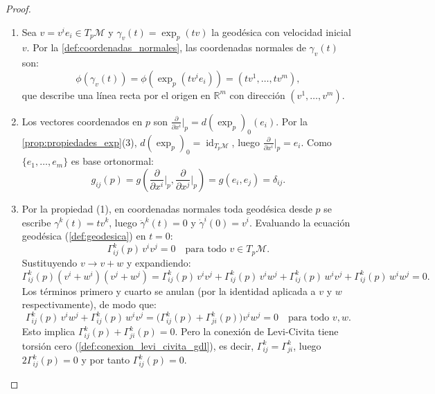 \begin{proof}
\leavevmode
\begin{enumerate}
	\item Sea $v = v^i e_i \in T_p\mathcal{M}$ y $\gamma_v(t) = \exp_p(tv)$ la geodésica con velocidad inicial $v$. Por la \autoref{def:coordenadas_normales}, las coordenadas normales de $\gamma_v(t)$ son:
	\[
	\phi(\gamma_v(t)) = \phi(\exp_p(t v^i e_i)) = (tv^1, \ldots, tv^m),
	\]
	que describe una línea recta por el origen en $\mathbb{R}^m$ con dirección $(v^1, \ldots, v^m)$.

	\item Los vectores coordenados en $p$ son $\frac{\partial}{\partial x^i}\big|_p = d(\exp_p)_0(e_i)$. Por la \autoref{prop:propiedades_exp}(3), $d(\exp_p)_0 = \operatorname{id}_{T_p\mathcal{M}}$, luego $\frac{\partial}{\partial x^i}\big|_p = e_i$. Como $\{e_1, \ldots, e_m\}$ es base ortonormal:
	\[
	g_{ij}(p) = g\!\left(\frac{\partial}{\partial x^i}\bigg|_p, \frac{\partial}{\partial x^j}\bigg|_p\right) = g(e_i, e_j) = \delta_{ij}.
	\]

	\item Por la propiedad (1), en coordenadas normales toda geodésica desde $p$ se escribe $\gamma^k(t) = tv^k$, luego $\ddot{\gamma}^k(t) = 0$ y $\dot{\gamma}^i(0) = v^i$. Evaluando la ecuación geodésica (\autoref{def:geodesica}) en $t = 0$:
	\[
	\Gamma^k_{ij}(p)\, v^i v^j = 0 \quad \text{para todo } v \in T_p\mathcal{M}.
	\]
	Sustituyendo $v \to v + w$ y expandiendo:
	\[
	\Gamma^k_{ij}(p)(v^i + w^i)(v^j + w^j) = \Gamma^k_{ij}(p)\,v^iv^j + \Gamma^k_{ij}(p)\,v^iw^j + \Gamma^k_{ij}(p)\,w^iv^j + \Gamma^k_{ij}(p)\,w^iw^j = 0.
	\]
	Los términos primero y cuarto se anulan (por la identidad aplicada a $v$ y $w$ respectivamente), de modo que:
	\[
	\Gamma^k_{ij}(p)\,v^iw^j + \Gamma^k_{ij}(p)\,w^iv^j = \bigl(\Gamma^k_{ij}(p) + \Gamma^k_{ji}(p)\bigr)v^i w^j = 0 \quad \text{para todo } v, w.
	\]
	Esto implica $\Gamma^k_{ij}(p) + \Gamma^k_{ji}(p) = 0$. Pero la conexión de Levi-Civita tiene torsión cero (\autoref{def:conexion_levi_civita_gdl}), es decir, $\Gamma^k_{ij} = \Gamma^k_{ji}$, luego $2\Gamma^k_{ij}(p) = 0$ y por tanto $\Gamma^k_{ij}(p) = 0$.


\end{enumerate}
\end{proof}
